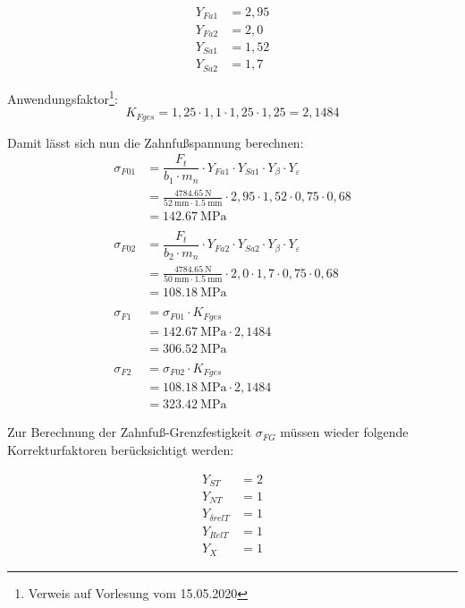 \documentclass[15pt,a4paper]{article}
\begin{document}
     \begin{align*}
     	Y_{Fa1}&=2,95 \tag{TB 21-19 a)}\\
     	Y_{Fa2}&=2,0\\
     	Y_{Sa1}&=1,52\tag{TB 21-19 b)}\\
     	Y_{Sa2}&=1,7
     \end{align*}
     
     Anwendungsfaktor\footnote[1]{Verweis auf Vorlesung vom 15.05.2020 }:
     $$K_{Fges}=1,25\cdot1,1\cdot1,25\cdot1,25 = 2,1484$$
     
     Damit lässt sich nun die Zahnfußspannung berechnen:
     \begin{align*}
     	\sigma_{F0 1}&=\dfrac{F_t}{b_1 \cdot m_n} \cdot Y_{Fa1} \cdot Y_{Sa1}\cdot Y_{\beta} \cdot Y_{\varepsilon} \tag{21.82}\\
     	&=\frac{\SI{4784,65}{\newton} }{\SI{52}{\milli\m}\cdot\SI{1,5}{\milli\m}}\cdot 2,95 \cdot 1,52 \cdot 0,75 \cdot 0,68 \\
     	&=\SI{142,67}{\mega\pascal}\\\\
     	\sigma_{F0 2}&=\dfrac{F_t}{b_2 \cdot m_n} \cdot Y_{Fa2} \cdot Y_{Sa2} \cdot Y_{\beta} \cdot Y_{\varepsilon} \\
     	&=\frac{\SI{4784,65}{\newton} }{\SI{50}{\milli\m}\cdot\SI{1,5}{\milli\m}}\cdot2,0 \cdot 1,7 \cdot 0,75 \cdot 0,68 \\
     	&=\SI{108,18}{\mega\pascal} \\\\
     	\sigma_{F1}&=\sigma_{F0 1} \cdot K_{Fges}\tag{21.83}\\
     	&=\SI{142,67}{\mega\pascal}\cdot 2,1484 \\
     	&=\SI{306,52}{\mega\pascal}\\\\
     	\sigma_{F2}&=\sigma_{F0 2} \cdot K_{Fges}\\
     	&=\SI{108,18}{\mega\pascal} \cdot 2,1484 \\
     	&=\SI{323,42}{\mega\pascal}
     \end{align*}
 
     
     
     Zur Berechnung der Zahnfuß-Grenzfestigkeit $\sigma_{FG}$ müssen wieder folgende Korrekturfaktoren berücksichtigt werden:
     
     \begin{align*}
     	Y_{ST} &=2 \tag{RM 21.5.4.2}\\
     	Y_{NT} &=1\\
     	Y_{\delta rel T} &=1\\
     	Y_{RelT}&=1\\
     	Y_X&=1 
     \end{align*}
     
\end{document}
